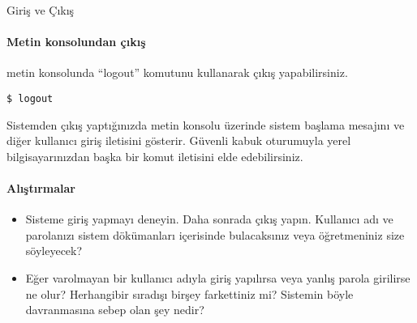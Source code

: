 \documentclass[10pt,a5paper]{book}
\begin{document}
\begin{section}{Giriş ve Çıkış}
\paragraph{Metin konsolundan çıkış}{ metin konsolunda “logout” komutunu kullanarak çıkış yapabilirsiniz.}

\begin{verbatim}
$ logout
\end{verbatim}

Sistemden çıkış yaptığınızda metin konsolu üzerinde sistem başlama mesajını ve diğer kullanıcı giriş iletisini gösterir. Güvenli kabuk oturumuyla yerel bilgisayarınızdan başka bir komut iletisini elde edebilirsiniz. 

\paragraph{Alıştırmalar}{
\begin{itemize}
 \item Sisteme giriş yapmayı deneyin. Daha sonrada çıkış yapın. Kullanıcı adı ve parolanızı sistem dökümanları içerisinde bulacaksınız veya öğretmeniniz size söyleyecek?
 \item Eğer varolmayan bir kullanıcı adıyla giriş yapılırsa veya yanlış parola girilirse ne olur? Herhangibir sıradışı birşey farkettiniz mi? Sistemin böyle davranmasına sebep olan şey nedir?
\end{itemize}}
\end{section}
\end{document}
